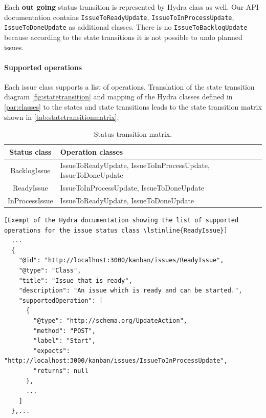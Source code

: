 Each \textbf{out going} status transition is represented by Hydra class as well. Our API documentation contains \lstinline{IssueToReadyUpdate}, \lstinline{IssueToInProcessUpdate}, \lstinline{IssueToDoneUpdate} as additional classes. There is no \lstinline{IssueToBacklogUpdate} because according to the state transitions it is not possible to undo planned issues.

\paragraph{Supported operations}
Each issue class supports a list of operations. Translation of the state transition diagram \ref{fig:statetransition} and mapping of the Hydra classes defined in \ref{par:classes} to the states and state transitions leads to the state transition matrix shown in \ref{tab:statetransitionmatrix}.

\begin{table}
  \begin{center}
    \begin{tabular}{ |c|l| }
      \hline
      Status class & Operation classes \\
      \hline
      BacklogIssue & IssueToReadyUpdate, IssueToInProcessUpdate, IssueToDoneUpdate \\
      ReadyIssue & IssueToInProcessUpdate, IssueToDoneUpdate \\
      InProcessIssue & IssueToReadyUpdate, IssueToDoneUpdate \\
      \hline
    \end{tabular}
    \caption{Status transition matrix.}
    \label{statetransitionmatrix}
  \end{center}
\end{table}

\lstset{language=JSON}
\begin{lstlisting}[Exempt of the Hydra documentation showing the list of supported operations for the issue status class \lstinline{ReadyIssue}]
  ...
  {
    "@id": "http://localhost:3000/kanban/issues/ReadyIssue",
    "@type": "Class",
    "title": "Issue that is ready",
    "description": "An issue which is ready and can be started.",
    "supportedOperation": [
      {
        "@type": "http://schema.org/UpdateAction",
        "method": "POST",
        "label": "Start",
        "expects": "http://localhost:3000/kanban/issues/IssueToInProcessUpdate",
        "returns": null
      },
      ...
    ]
  },...
\end{lstlisting}


